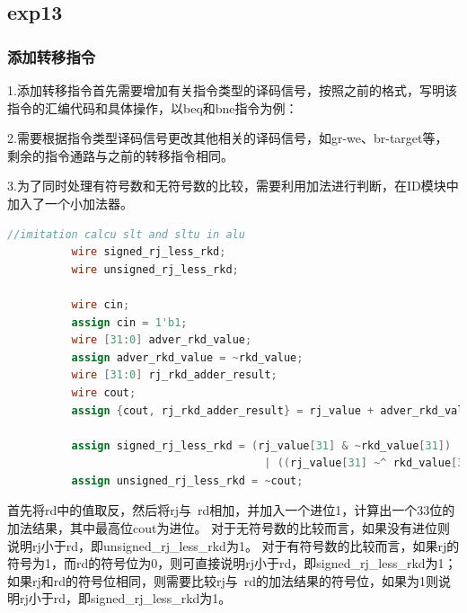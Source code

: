 \documentclass[12pt,a4paper]{article}
\begin{document}
        
            
    \subsection{exp13}
        \subsubsection{添加转移指令}
          1.添加转移指令首先需要增加有关指令类型的译码信号，按照之前的格式，写明该指令的汇编代码和具体操作，以beq和bne指令为例：
          \par
          2.需要根据指令类型译码信号更改其他相关的译码信号，如gr-we、br-target等，剩余的指令通路与之前的转移指令相同。
          \par
          3.为了同时处理有符号数和无符号数的比较，需要利用加法进行判断，在ID模块中加入了一个小加法器。
          \begin{lstlisting}[language=Verilog]
            //imitation calcu slt and sltu in alu
          wire signed_rj_less_rkd;
          wire unsigned_rj_less_rkd;

          wire cin;
          assign cin = 1'b1;
          wire [31:0] adver_rkd_value;
          assign adver_rkd_value = ~rkd_value;
          wire [31:0] rj_rkd_adder_result;
          wire cout;
          assign {cout, rj_rkd_adder_result} = rj_value + adver_rkd_value + cin;

          assign signed_rj_less_rkd = (rj_value[31] & ~rkd_value[31])
                                        | ((rj_value[31] ~^ rkd_value[31]) & rj_rkd_adder_result[31]);
          assign unsigned_rj_less_rkd = ~cout;  
          \end{lstlisting}
          首先将rd中的值取反，然后将rj与~rd相加，并加入一个进位1，计算出一个33位的加法结果，其中最高位cout为进位。
          对于无符号数的比较而言，如果没有进位则说明rj小于rd，即unsigned\_rj\_less\_rkd为1。
          对于有符号数的比较而言，如果rj的符号为1，而rd的符号位为0，则可直接说明rj小于rd，即signed\_rj\_less\_rkd为1；
          如果rj和rd的符号位相同，则需要比较rj与~rd的加法结果的符号位，如果为1则说明rj小于rd，即signed\_rj\_less\_rkd为1。
        
\end{document}
